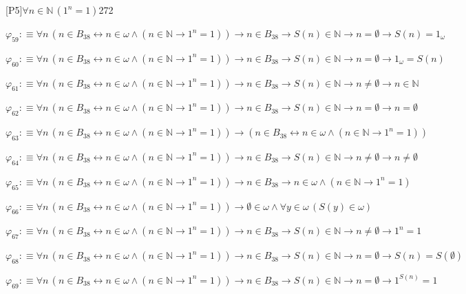 \begin{fullproof}{[P5]}{$\forall n \in \mathbb{N}\,({{1}^{n}} = 1)$}{272}
\begin{abbrevlist}
\item $\varphi_{59} :\equiv \forall n\,(n \in B_{38} \leftrightarrow n \in \omega \land (n \in \mathbb{N} \to {{1}^{n}} = 1)) \to n \in B_{38} \to S(n) \in \mathbb{N} \to n = \emptyset \to S(n) = 1_{\omega}$
\item $\varphi_{60} :\equiv \forall n\,(n \in B_{38} \leftrightarrow n \in \omega \land (n \in \mathbb{N} \to {{1}^{n}} = 1)) \to n \in B_{38} \to S(n) \in \mathbb{N} \to n = \emptyset \to 1_{\omega} = S(n)$
\item $\varphi_{61} :\equiv \forall n\,(n \in B_{38} \leftrightarrow n \in \omega \land (n \in \mathbb{N} \to {{1}^{n}} = 1)) \to n \in B_{38} \to S(n) \in \mathbb{N} \to n \neq \emptyset \to n \in \mathbb{N}$
\item $\varphi_{62} :\equiv \forall n\,(n \in B_{38} \leftrightarrow n \in \omega \land (n \in \mathbb{N} \to {{1}^{n}} = 1)) \to n \in B_{38} \to S(n) \in \mathbb{N} \to n = \emptyset \to n = \emptyset$
\item $\varphi_{63} :\equiv \forall n\,(n \in B_{38} \leftrightarrow n \in \omega \land (n \in \mathbb{N} \to {{1}^{n}} = 1)) \to (n \in B_{38} \leftrightarrow n \in \omega \land (n \in \mathbb{N} \to {{1}^{n}} = 1))$
\item $\varphi_{64} :\equiv \forall n\,(n \in B_{38} \leftrightarrow n \in \omega \land (n \in \mathbb{N} \to {{1}^{n}} = 1)) \to n \in B_{38} \to S(n) \in \mathbb{N} \to n \neq \emptyset \to n \neq \emptyset$
\item $\varphi_{65} :\equiv \forall n\,(n \in B_{38} \leftrightarrow n \in \omega \land (n \in \mathbb{N} \to {{1}^{n}} = 1)) \to n \in B_{38} \to n \in \omega \land (n \in \mathbb{N} \to {{1}^{n}} = 1)$
\item $\varphi_{66} :\equiv \forall n\,(n \in B_{38} \leftrightarrow n \in \omega \land (n \in \mathbb{N} \to {{1}^{n}} = 1)) \to \emptyset \in \omega \land \forall y \in \omega\,(S(y) \in \omega)$
\item $\varphi_{67} :\equiv \forall n\,(n \in B_{38} \leftrightarrow n \in \omega \land (n \in \mathbb{N} \to {{1}^{n}} = 1)) \to n \in B_{38} \to S(n) \in \mathbb{N} \to n \neq \emptyset \to {{1}^{n}} = 1$
\item $\varphi_{68} :\equiv \forall n\,(n \in B_{38} \leftrightarrow n \in \omega \land (n \in \mathbb{N} \to {{1}^{n}} = 1)) \to n \in B_{38} \to S(n) \in \mathbb{N} \to n = \emptyset \to S(n) = S(\emptyset)$
\item $\varphi_{69} :\equiv \forall n\,(n \in B_{38} \leftrightarrow n \in \omega \land (n \in \mathbb{N} \to {{1}^{n}} = 1)) \to n \in B_{38} \to S(n) \in \mathbb{N} \to n = \emptyset \to {{1}^{S(n)}} = 1$

\end{abbrevlist}
\end{fullproof}
